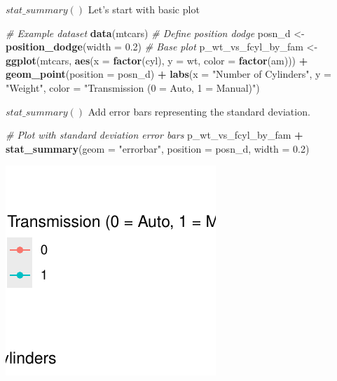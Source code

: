 \documentclass[
  ignorenonframetext,
]{beamer}
\newenvironment{Shaded}{\begin{snugshade}}{\end{snugshade}}
\newcommand{\AttributeTok}[1]{\textcolor[rgb]{0.13,0.29,0.53}{#1}}
\newcommand{\CommentTok}[1]{\textcolor[rgb]{0.56,0.35,0.01}{\textit{#1}}}
\newcommand{\FloatTok}[1]{\textcolor[rgb]{0.00,0.00,0.81}{#1}}
\newcommand{\FunctionTok}[1]{\textcolor[rgb]{0.13,0.29,0.53}{\textbf{#1}}}
\newcommand{\NormalTok}[1]{#1}
\newcommand{\OtherTok}[1]{\textcolor[rgb]{0.56,0.35,0.01}{#1}}
\newcommand{\SpecialCharTok}[1]{\textcolor[rgb]{0.81,0.36,0.00}{\textbf{#1}}}
\newcommand{\StringTok}[1]{\textcolor[rgb]{0.31,0.60,0.02}{#1}}
\begin{document}
\begin{frame}[fragile]{\(stat\_summary()\)}
\label{stat_summary-2}
Let's start with basic plot


\begin{Shaded}
\begin{Highlighting}[]
\CommentTok{\# Example dataset}
\FunctionTok{data}\NormalTok{(mtcars)}
\CommentTok{\# Define position dodge}
\NormalTok{posn\_d }\OtherTok{\textless{}{-}} \FunctionTok{position\_dodge}\NormalTok{(}\AttributeTok{width =} \FloatTok{0.2}\NormalTok{)}
\CommentTok{\# Base plot}
\NormalTok{p\_wt\_vs\_fcyl\_by\_fam }\OtherTok{\textless{}{-}} \FunctionTok{ggplot}\NormalTok{(mtcars, }\FunctionTok{aes}\NormalTok{(}\AttributeTok{x =} \FunctionTok{factor}\NormalTok{(cyl), }\AttributeTok{y =}\NormalTok{ wt,}
    \AttributeTok{color =} \FunctionTok{factor}\NormalTok{(am))) }\SpecialCharTok{+} \FunctionTok{geom\_point}\NormalTok{(}\AttributeTok{position =}\NormalTok{ posn\_d) }\SpecialCharTok{+} \FunctionTok{labs}\NormalTok{(}\AttributeTok{x =} \StringTok{"Number of Cylinders"}\NormalTok{,}
    \AttributeTok{y =} \StringTok{"Weight"}\NormalTok{, }\AttributeTok{color =} \StringTok{"Transmission (0 = Auto, 1 = Manual)"}\NormalTok{)}
\end{Highlighting}
\end{Shaded}
\end{frame}

\begin{frame}[fragile]{\(stat\_summary()\)}
\label{stat_summary-3}
Add error bars representing the standard deviation.


\begin{Shaded}
\begin{Highlighting}[]
\CommentTok{\# Plot with standard deviation error bars}
\NormalTok{p\_wt\_vs\_fcyl\_by\_fam }\SpecialCharTok{+} \FunctionTok{stat\_summary}\NormalTok{(}\AttributeTok{geom =} \StringTok{"errorbar"}\NormalTok{, }\AttributeTok{position =}\NormalTok{ posn\_d,}
    \AttributeTok{width =} \FloatTok{0.2}\NormalTok{)}
\end{Highlighting}
\end{Shaded}

\begin{center}\includegraphics[width=0.5\linewidth]{Figs/unnamed-chunk-33-1} \end{center}
\end{frame}
\end{document}
